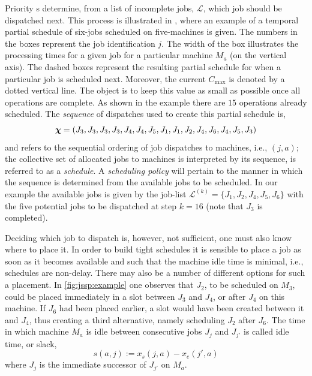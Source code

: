 \documentclass[smallextended]{svjour3}
\begin{document}
Priority \dr s determine, from a list of incomplete jobs, 
$\mathcal{L}$, which job should be dispatched next. This process is illustrated 
in , where an example of 
a temporal partial schedule of six-jobs scheduled on five-machines is given. 
The numbers in the boxes represent the job identification $j$. 
The width of the box illustrates the processing times for a given job for a 
particular machine $M_a$ (on the vertical axis). 
The dashed boxes represent the resulting partial schedule for when a particular 
job is scheduled next. 
Moreover, the current $C_{\max}$ is denoted by a dotted vertical line. 
The object is to keep this value as small as possible once all operations are 
complete. As shown in the example there are $15$ operations already scheduled. 
The \textit{sequence} of dispatches used to create this partial schedule is,
\begin{equation}
	\bm \chi=\left(J_3,J_3,J_3,J_3,J_4,J_4,J_5,J_1,J_1,J_2,J_4,J_6,J_4,J_5,J_3\right)
\end{equation}
and refers to the sequential ordering of job dispatches to machines, i.e., $(j,a)$; 
the collective set of allocated jobs to machines is interpreted by its 
sequence, is referred to as a \emph{schedule}.
A \emph{scheduling policy} will pertain to the manner in which 
the sequence is determined from the available jobs to be scheduled. 
In our example the available jobs is given by the job-list
$\mathcal{L}^{(k)}=\{J_1,J_2,J_4,J_5,J_6\}$ with the five potential jobs 
to be dispatched at step $k=16$ (note that $J_3$ is completed).

Deciding which job to dispatch is, however, not sufficient, one must also know 
where to place it. In order to build tight schedules it is sensible to place a 
job as soon as it becomes available and such that the machine idle time is 
minimal, i.e., schedules are non-delay. 
There may also be a number of different options for such a placement. 
In \cref{fig:jssp:example} one observes that $J_2$, to be scheduled on $M_3$, 
could be placed immediately in a slot between $J_3$ and $J_4$, or after $J_4$ 
on this machine. 
If $J_6$ had been placed earlier, a slot would have been created between it and 
$J_4$, thus creating a third alternative, namely scheduling $J_2$ after $J_6$. 
The time in which machine $M_a$ is idle between consecutive jobs $J_j$ and 
$J_{j'}$ is called idle time, or slack, 
\begin{equation} 
s(a,j):=x_s(j,a)-x_e(j',a) \label{eq:slack}
\end{equation}
where $J_j$ is the immediate successor of $J_{j'}$ on $M_a$. 
\end{document}
